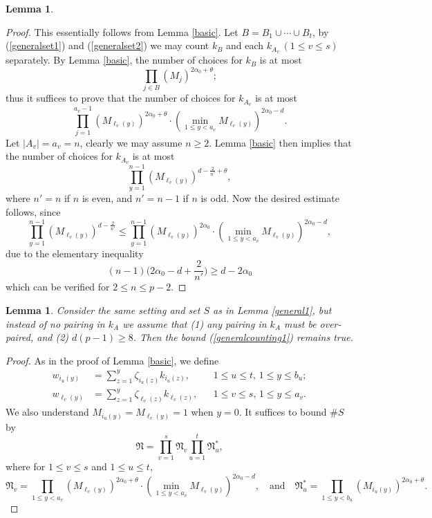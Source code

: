 \documentclass[11 pt,reqno]{amsart}
\newtheorem{lem}[thm]{Lemma}
\theoremstyle{definition}
\theoremstyle{remark}
\numberwithin{equation}{section}
\newcommand{\Nf}{\mathfrak{N}}
\begin{document}
{\begin{lem}
\begin{equation}
 \end{equation}
\end{lem}
\begin{proof} This essentially follows from Lemma \ref{basic}. Let $B=B_1\cup\cdots\cup B_t$, by (\ref{generalset1}) and (\ref{generalset2}) we may count $k_B$ and each $k_{A_v}\,(1\leq v\leq s)$ separately. By Lemma \ref{basic}, the number of choices for $k_B$ is at most
\[\prod_{j\in B}(M_j)^{2\alpha_0+\theta};\] thus it suffices to prove that the number of choices for $k_{A_v}$ is at most
\[\prod_{j=1}^{a_v-1}(M_{\ell_v(y)})^{2\alpha_0+\theta}\cdot (\min_{1\leq y<a_v}M_{\ell_v(y)})^{2\alpha_0-d}.\] Let $|A_v|=a_v=n$, clearly we may assume $n\geq 2$. Lemma \ref{basic} then implies that the number of choices for $k_{A_v}$ is at most
\[\prod_{y=1}^{n-1}(M_{\ell_v(y)})^{d-\frac{2}{n'}+\theta},\] where $n'=n$ if $n$ is even, and $n'=n-1$ if $n$ is odd. Now the desired estimate follows, since
\[\prod_{y=1}^{n-1}(M_{\ell_v(y)})^{d-\frac{2}{n'}}\leq \prod_{y=1}^{n-1}(M_{\ell_v(y)})^{2\alpha_0}\cdot (\min_{1\leq y<a_v}M_{\ell_v(y)})^{2\alpha_0-d},\] due to the elementary inequality
\[(n-1)\big(2\alpha_0-d+\frac{2}{n'}\big)\geq d-2\alpha_0\] which can be verified for $2\leq n\leq p-2$.
\end{proof}
\begin{lem}\label{general2} Consider the same setting and set $S$ as in Lemma \ref{general1}, but instead of no pairing in $k_A$ we assume that (1) any pairing in $k_A$ must be over-paired, and (2) $d(p-1)\geq 8$. Then the bound (\ref{generalcounting1}) remains true.
\end{lem}
\begin{proof} As in the proof of Lemma \ref{basic}, we define
\[
\begin{aligned}w_{i_u(y)}&=\sum_{z=1}^y\zeta_{i_u(z)}k_{i_u(z)},&&1\leq u\leq t,\,1\leq y\leq b_u;\\
w_{\ell_v(y)}&=\sum_{z=1}^y\zeta_{\ell_v(z)}k_{\ell_v(z)},&&1\leq v\leq s,\,1\leq y\leq a_v.
\end{aligned}\] We also understand $M_{i_u(y)}=M_{\ell_v(y)}=1$ when $y=0$. It suffices to bound $\#S$ by 
\begin{equation}\Nf=\prod_{v=1}^s\Nf_v\prod_{u=1}^t\Nf_u^*,
\end{equation} where for $1\leq v\leq s$ and $1\leq u\leq t$,
\begin{equation}\label{factorseach}\Nf_v=\prod_{1\leq y<a_v}(M_{\ell_v(y)})^{2\alpha_0+\theta}\cdot(\min_{1\leq y<a_v}M_{\ell_v(y)})^{2\alpha_0-d},\quad\textrm{and}\quad \Nf_u^*=\prod_{1\leq y<b_u}(M_{i_u(y)})^{2\alpha_0+\theta}.

\end{equation}
\end{proof}}
\end{document}

